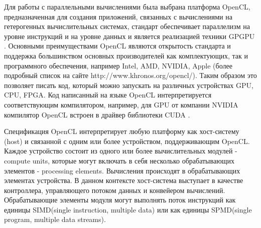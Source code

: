 Для работы с параллельными вычислениями была выбрана платформа OpenCL, предназначенная для создания приложений, связанных с вычислениями на гетерогенных вычислительных системах, стандарт обеспечивает параллелизм на уровне инструкций и на уровне  данных и является реализацией техники GPGPU  \cite{Munshi2011, Stone2010}. Основными  преимуществами OpenCL являются открытость стандарта и поддержка большинством основных производителей как комплектующих, так и программного обеспечения, например Intel, AMD, NVIDIA, Apple (более подробный список на сайте http://www.khronos.org/opencl/). Таким образом это позволяет писать код, который можно запускать на различных устройствах GPU, CPU, FPGA. Код написанный на языке OpenCL интерпретируется соответствующим  компилятором, например, для GPU от компании NVIDIA компилятор OpenCL встроен в драйвер библиотеки CUDA \cite{Cook2012}.

Спецификация OpenCL интерпретирует любую платформу как хост-систему (host) и связанной с одним или более устройством, поддерживающим OpenCL. Каждое устройство состоит из одного или более вычислительных модулей - compute units,  которые  могут  включать  в  себя  несколько обрабатывающих элементов - processing elements. Вычисления  происходят  в обрабатывающих элементах устройства. В данном контексте хост-система выступает в качестве контроллера, управляющего потоком  данных и конвейером вычислений. Обрабатывающие элементы модуля могут выполнять поток инструкций как единицы SIMD(single instruction, multiple data)\cite{Flynn1972} или как единицы SPMD(single program, multiple data streams)\cite{Darema2011}.

